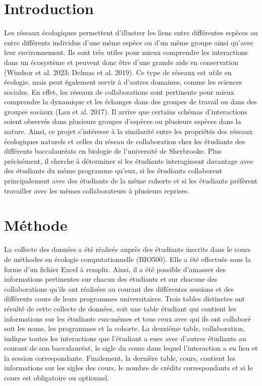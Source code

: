 \documentclass[9pt,twocolumn,twoside,]{pnas-new}
\begin{document}
\hypertarget{introduction}{%
\section{Introduction}\label{introduction}}

Les réseaux écologiques permettent d'illustrer les liens entre
différentes espèces ou entre différents individus d'une même espèce ou
d'un même groupe ainsi qu'avec leur environnement. Ils sont très utiles
pour mieux comprendre les interactions dans un écosystème et peuvent
donc être d'une grande aide en conservation (Windsor et al. 2023; Delmas
et al. 2019). Ce type de réseaux est utile en écologie, mais peut
également servir à d'autres domaines, comme les sciences sociales. En
effet, les réseaux de collaborations sont pertinents pour mieux
comprendre la dynamique et les échanges dans des groupes de travail ou
dans des groupes sociaux (Lau et al. 2017). Il arrive que certains
schémas d'interactions soient observés dans plusieurs groupes d'espèces
ou plusieurs espèces dans la nature. Ainsi, ce projet s'intéresse à la
similarité entre les propriétés des réseaux écologiques naturels et
celles du réseau de collaboration chez les étudiants des différents
baccalauréats en biologie de l'université de Sherbrooke. Plus
précisément, il cherche à déterminer si les étudiants interagissent
davantage avec des étudiants du même programme qu'eux, si les étudiants
collaborent principalement avec des étudiants de la même cohorte et si
les étudiants préfèrent travailler avec les mêmes collaborateurs à
plusieurs reprises.

\hypertarget{muxe9thode}{%
\section{Méthode}\label{muxe9thode}}

La collecte des données a été réalisée auprès des étudiants inscrits
dans le cours de méthodes en écologie computationnelle (BIO500). Elle a
été effectuée sous la forme d'un fichier Excel à remplir. Ainsi, il a
été possible d'amasser des informations pertinentes sur chacun des
étudiants et sur chacune des collaborations qu'ils ont réalisées au
courant des différentes sessions et des différents cours de leurs
programmes universitaires. Trois tables distinctes ont résulté de cette
collecte de données, soit une table étudiant qui contient les
informations sur les étudiants eux-mêmes et tous ceux avec qui ils ont
collaboré soit les noms, les programmes et la cohorte. La deuxième
table, collaboration, indique toutes les interactions que l'étudiant a
eues avec d'autres étudiants au courant de son baccalauréat, le sigle du
cours dans lequel l'interaction a eu lieu et la session correspondante.
Finalement, la dernière table, cours, contient les informations sur les
sigles des cours, le nombre de crédits correspondants et si le cours est
obligatoire ou optionnel.
\end{document}
